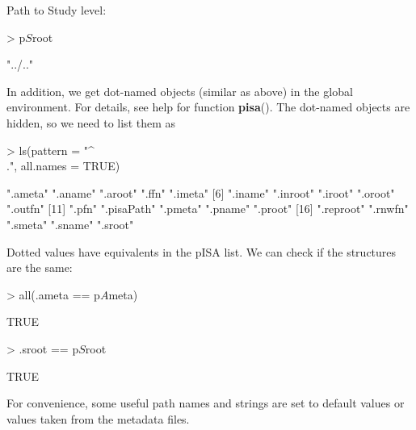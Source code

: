 \documentclass[a4paper,12pt]{article}\usepackage[]{graphicx}\usepackage[]{color}
\providecommand{\fct}[1]{{\ttfamily\textbf{#1}()}}
\begin{document}
Path to Study level:

\begin{Schunk}
\begin{Sinput}
> p$S$root
\end{Sinput}
\begin{Soutput}
[1] "../.."
\end{Soutput}
\end{Schunk}

In addition, we get  dot-named objects (similar as above) in the global environment. For details, see help for function \fct{pisa}. The dot-named objects are hidden, so we need to list them as

\begin{Schunk}
\begin{Sinput}
> ls(pattern = "^\\.", all.names = TRUE)
\end{Sinput}
\begin{Soutput}
 [1] ".ameta"    ".aname"    ".aroot"    ".ffn"      ".imeta"   
 [6] ".iname"    ".inroot"   ".iroot"    ".oroot"    ".outfn"   
[11] ".pfn"      ".pisaPath" ".pmeta"    ".pname"    ".proot"   
[16] ".reproot"  ".rnwfn"    ".smeta"    ".sname"    ".sroot"   
\end{Soutput}
\end{Schunk}

Dotted values have equivalents in the pISA list. We can check if the structures are the same:

\begin{Schunk}
\begin{Sinput}
> all(.ameta == p$A$meta)
\end{Sinput}
\begin{Soutput}
[1] TRUE
\end{Soutput}
\begin{Sinput}
> .sroot == p$S$root
\end{Sinput}
\begin{Soutput}
[1] TRUE
\end{Soutput}
\end{Schunk}


For convenience, some useful path names and strings are set to default values or values taken from the metadata files. 
\end{document}
